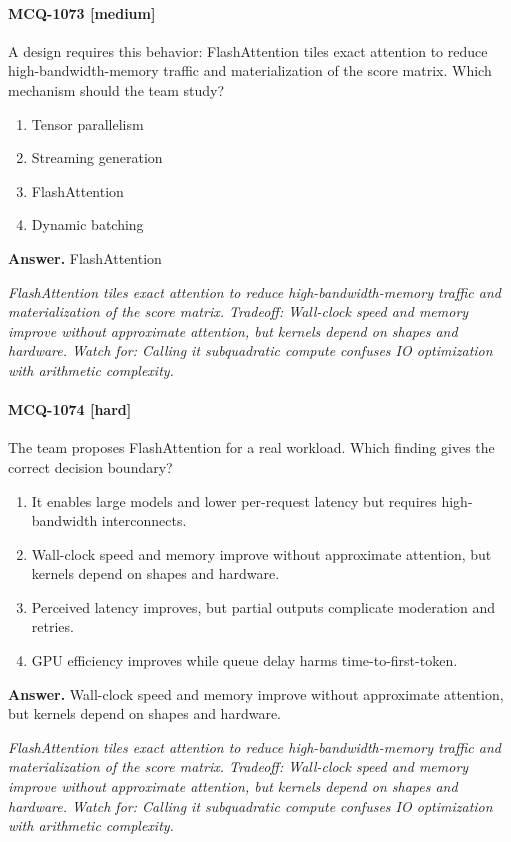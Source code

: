 \paragraph{MCQ-1073 [medium]} A design requires this behavior: FlashAttention tiles exact attention to reduce high-bandwidth-memory traffic and materialization of the score matrix. Which mechanism should the team study?
\begin{enumerate}[label=\Alph*.]
\item Tensor parallelism
\item Streaming generation
\item FlashAttention
\item Dynamic batching
\end{enumerate}
\noindent\textbf{Answer.} FlashAttention
\par\textit{FlashAttention tiles exact attention to reduce high-bandwidth-memory traffic and materialization of the score matrix. Tradeoff: Wall-clock speed and memory improve without approximate attention, but kernels depend on shapes and hardware. Watch for: Calling it subquadratic compute confuses IO optimization with arithmetic complexity.}
\paragraph{MCQ-1074 [hard]} The team proposes FlashAttention for a real workload. Which finding gives the correct decision boundary?
\begin{enumerate}[label=\Alph*.]
\item It enables large models and lower per-request latency but requires high-bandwidth interconnects.
\item Wall-clock speed and memory improve without approximate attention, but kernels depend on shapes and hardware.
\item Perceived latency improves, but partial outputs complicate moderation and retries.
\item GPU efficiency improves while queue delay harms time-to-first-token.
\end{enumerate}
\noindent\textbf{Answer.} Wall-clock speed and memory improve without approximate attention, but kernels depend on shapes and hardware.
\par\textit{FlashAttention tiles exact attention to reduce high-bandwidth-memory traffic and materialization of the score matrix. Tradeoff: Wall-clock speed and memory improve without approximate attention, but kernels depend on shapes and hardware. Watch for: Calling it subquadratic compute confuses IO optimization with arithmetic complexity.}
